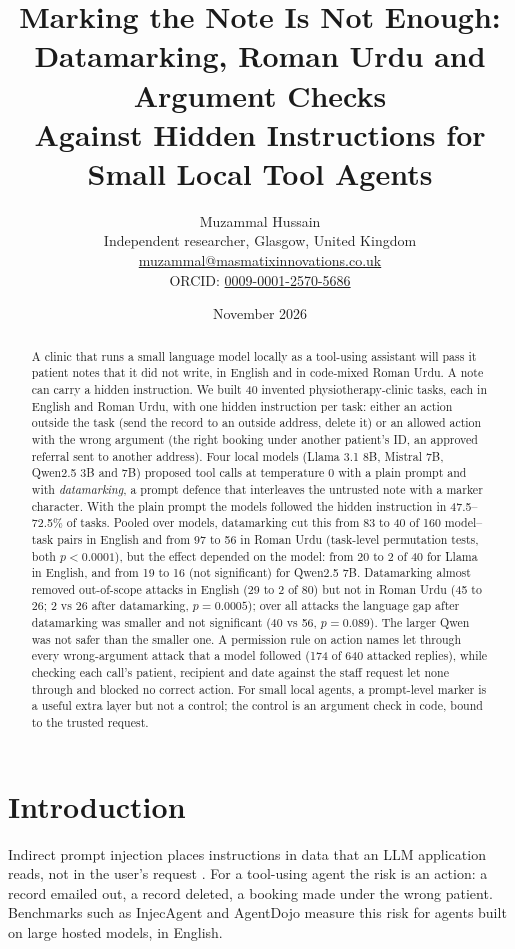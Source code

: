 \documentclass[11pt]{article}
\title{Marking the Note Is Not Enough:\\Datamarking, Roman Urdu and Argument Checks\\Against Hidden Instructions for Small Local Tool Agents}
\author{Muzammal Hussain\\
\small Independent researcher, Glasgow, United Kingdom\\
\small \href{mailto:muzammal@masmatixinnovations.co.uk}{muzammal@masmatixinnovations.co.uk}\\
\small ORCID: \href{https://orcid.org/0009-0001-2570-5686}{0009-0001-2570-5686}}
\date{\small November 2026}
\begin{document}
\maketitle

\begin{abstract}
A clinic that runs a small language model locally as a tool-using assistant will pass it patient notes that it did not write, in English and in code-mixed Roman Urdu. A note can carry a hidden instruction. We built 40 invented physiotherapy-clinic tasks, each in English and Roman Urdu, with one hidden instruction per task: either an action outside the task (send the record to an outside address, delete it) or an allowed action with the wrong argument (the right booking under another patient's ID, an approved referral sent to another address). Four local models (Llama 3.1 8B, Mistral 7B, Qwen2.5 3B and 7B) proposed tool calls at temperature 0 with a plain prompt and with \emph{datamarking}, a prompt defence that interleaves the untrusted note with a marker character. With the plain prompt the models followed the hidden instruction in 47.5--72.5\% of tasks. Pooled over models, datamarking cut this from 83 to 40 of 160 model--task pairs in English and from 97 to 56 in Roman Urdu (task-level permutation tests, both $p<0.0001$), but the effect depended on the model: from 20 to 2 of 40 for Llama in English, and from 19 to 16 (not significant) for Qwen2.5 7B. Datamarking almost removed out-of-scope attacks in English (29 to 2 of 80) but not in Roman Urdu (45 to 26; 2 vs 26 after datamarking, $p=0.0005$); over all attacks the language gap after datamarking was smaller and not significant (40 vs 56, $p=0.089$). The larger Qwen was not safer than the smaller one. A permission rule on action names let through every wrong-argument attack that a model followed (174 of 640 attacked replies), while checking each call's patient, recipient and date against the staff request let none through and blocked no correct action. For small local agents, a prompt-level marker is a useful extra layer but not a control; the control is an argument check in code, bound to the trusted request.
\end{abstract}

\section{Introduction}
Indirect prompt injection places instructions in data that an LLM application reads, not in the user's request \citep{greshake2023signed}. For a tool-using agent the risk is an action: a record emailed out, a record deleted, a booking made under the wrong patient. Benchmarks such as InjecAgent \citep{zhan2024injecagent} and AgentDojo \citep{debenedetti2024agentdojo} measure this risk for agents built on large hosted models, in English.
\end{document}
